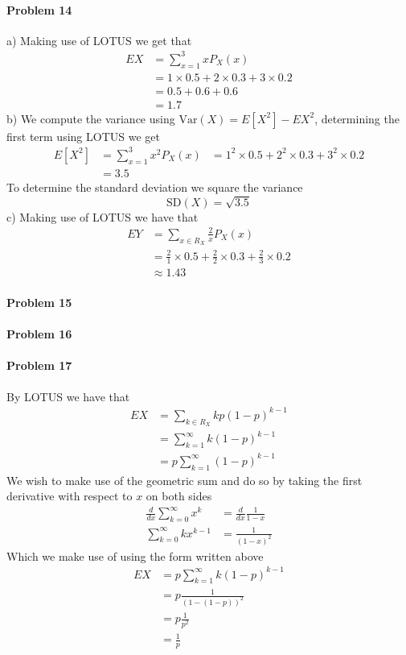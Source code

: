 \paragraph{Problem 14}
a)
Making use of LOTUS we get that
\begin{align*}
    EX&=\sum_{x=1}^{3}xP_{X}(x) \\
      &=1\times 0.5+2\times 0.3+3\times 0.2 \\
      &=0.5+0.6+0.6 \\
      &=1.7
\end{align*}
b)
We compute the variance using $\text{Var}(X)=E[X^{2}]-EX^{2}$, determining the first term using LOTUS we get
\begin{align*}
    E[X^{2}]&=\sum_{x=1}^{3}x^{2}P_{X}(x)
         &=1^{2}\times 0.5+2^{2}\times 0.3+3^{2}\times 0.2 \\
         &=3.5
\end{align*}
To determine the standard deviation we square the variance
\[
    \text{SD}(X)=\sqrt{3.5}
\]
c)
Making use of LOTUS we have that
\begin{align*}
    EY&=\sum_{x\in R_{X}}\frac{2}{x}P_{X}(x) \\
      &=\frac{2}{1}\times 0.5+\frac{2}{2}\times 0.3+\frac{2}{3}\times 0.2 \\
      &\approx 1.43
\end{align*}
\paragraph{Problem 15}
\paragraph{Problem 16}
\paragraph{Problem 17}
By LOTUS we have that
\begin{align*}
    EX&=\sum_{k\in R_{X}}kp(1-p)^{k-1} \\
    &=\sum_{k=1}^{\infty}k(1-p)^{k-1} \\
    &=p\sum_{k=1}^{\infty}(1-p)^{k-1}
\end{align*}
We wish to make use of the geometric sum and do so by taking the first derivative with respect to $x$ on both sides
\begin{align*}
    \frac{d}{dx}\sum_{k=0}^{\infty}x^{k}&=\frac{d}{dx}\frac{1}{1-x} \\
    \sum_{k=0}^{\infty}kx^{k-1}&=\frac{1}{(1-x)^{2}}
\end{align*}
Which we make use of using the form written above
\begin{align*}
    EX&=p\sum_{k=1}^{\infty}k(1-p)^{k-1} \\
      &=p\frac{1}{(1-(1-p))^{2}} \\
      &=p\frac{1}{p^{2}} \\
      &=\frac{1}{p}
\end{align*}
